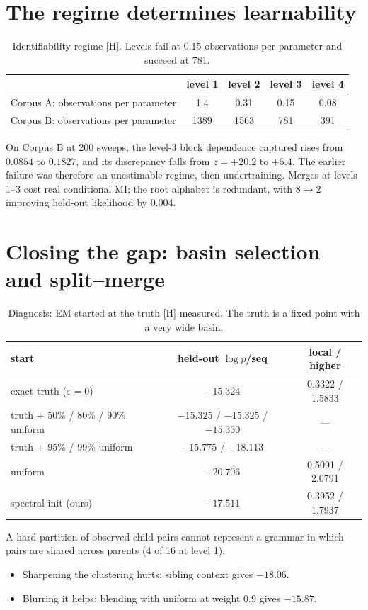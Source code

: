 \documentclass[11pt]{article}
\theoremstyle{definition}
\theoremstyle{remark}
\newcommand{\src}[1]{\textsf{\small[#1]}}
\newcommand{\st}[1]{\textsf{\small\color{gray}#1}}
\begin{document}
\section{The regime determines learnability}
\begin{table}[!htbp]\centering\small
\begin{tabular}{lcccc}
\toprule
 & level 1 & level 2 & level 3 & level 4\\
\midrule
Corpus A: observations per parameter & 1.4 & 0.31 & 0.15 & 0.08\\
Corpus B: observations per parameter & 1389 & 1563 & 781 & 391\\
\bottomrule
\end{tabular}
\caption{Identifiability regime \src{H}. Levels fail at 0.15 observations per parameter and succeed at 781.}\label{tab:regime}
\end{table}
On Corpus B at 200 sweeps, the level-3 block dependence captured rises from $0.0854$ to $0.1827$, and its discrepancy falls from $z=+20.2$ to $+5.4$. The earlier failure was therefore an unestimable regime, then undertraining. Merges at levels 1--3 cost real conditional MI; the root alphabet is redundant, with $8\to2$ improving held-out likelihood by $0.004$.

\section{Closing the gap: basin selection and split--merge}
\begin{table}[!htbp]\centering\small
\begin{tabular}{lcc}
\toprule
start & held-out $\log p$/seq & local / higher\\
\midrule
exact truth ($\varepsilon=0$) & $-15.324$ & 0.3322 / 1.5833\\
truth + 50\% / 80\% / 90\% uniform & $-15.325$ / $-15.325$ / $-15.330$ & ---\\
truth + 95\% / 99\% uniform & $-15.775$ / $-18.113$ & ---\\
uniform & $-20.706$ & 0.5091 / 2.0791\\
spectral init (ours) & $-17.511$ & 0.3952 / 1.7937\\
\bottomrule
\end{tabular}
\caption{Diagnosis: EM started at the truth \src{H} \st{measured}. The truth is a fixed point with a very wide basin.}
\end{table}

\noindent A hard partition of observed child pairs cannot represent a grammar in which pairs are shared across parents (4 of 16 at level 1).
\begin{itemize}
  \item Sharpening the clustering hurts: sibling context gives $-18.06$.
  \item Blurring it helps: blending with uniform at weight 0.9 gives $-15.87$.
\end{itemize}
\end{document}
